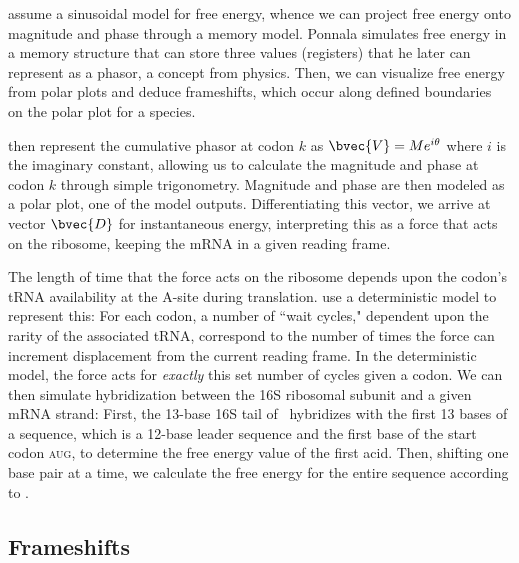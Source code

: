 \documentclass[12pt]{article}
\numberwithin{equation}{section}
\begin{document}
\citet{lalit:mechanics} assume a sinusoidal model for
free energy, whence we can project free energy onto magnitude and
phase through a memory model. Ponnala simulates free
energy in a memory structure that can store three values (registers)
that he later can represent as a phasor, a concept from physics. Then,
we can visualize free energy from polar plots and deduce frameshifts,
which occur along defined boundaries~\citet{lalit:mechanics} on the polar plot for a species.
 
\citet{lalit:embs} then represent the cumulative phasor
at codon $k$ as $\bvec{V} = Me^{i\theta}$ where $i$ is the imaginary
constant, allowing us to calculate the magnitude and phase at codon
$k$ through simple trigonometry. Magnitude and phase are then modeled
as a polar plot, one of the model outputs. Differentiating this vector, we
arrive at vector $\bvec{D}$ for instantaneous energy, interpreting
this as a force that acts on the ribosome, keeping the mRNA in
a given reading frame.
 
The length of time that the force acts on the ribosome depends upon
the codon's tRNA availability at the A-site during translation.
\citeauthor{lalit:mechanics} use a deterministic model to represent this: For each codon,
a number of ``wait cycles," dependent upon the rarity of the
associated tRNA, correspond to the number of times the force can
increment displacement from the current reading frame.  In the
deterministic model, the force acts for \emph{exactly} this set number
of cycles given a codon. We can then simulate hybridization between the
16S ribosomal subunit and a given mRNA strand: First, the 13-base 16S
tail of \ecoli\ hybridizes with the first 13 bases of a sequence,
which is a 12-base leader sequence and the first base of the start
codon \textsc{aug}, to determine the free energy value of the first acid.
Then, shifting one base pair at a time, we calculate the free energy
for the entire sequence according to \citet{starmer}.

\subsection{Frameshifts}
\label{section:frameshifts}
\end{document}
